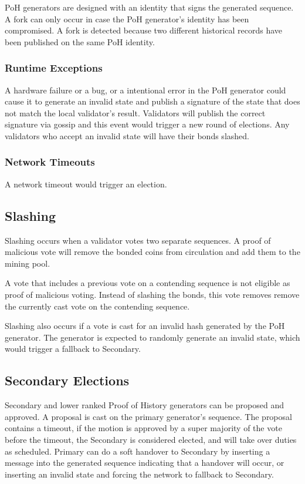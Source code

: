 \documentclass[12pt]{ltjsarticle}
\begin{document}
PoH generators are designed with an identity that signs the generated sequence. A fork can only occur in case the PoH generator’s identity has been compromised. A fork is detected because two different historical records have been published on the same PoH identity.

\subsubsection{Runtime Exceptions}
A hardware failure or a bug, or a intentional error in the PoH generator could cause it to generate an invalid state and publish a signature of the state that does not match the local validator’s result. Validators will publish the correct signature via gossip and this event would trigger a new round of elections. Any validators who accept an invalid state will have their bonds slashed.

\subsubsection{Network Timeouts}

A network timeout would trigger an election.

\subsection{Slashing}
Slashing occurs when a validator votes two separate sequences. A proof of malicious vote will remove the bonded coins from circulation and add them to the mining pool.

A vote that includes a previous vote on a contending sequence is not eligible as proof of malicious voting. Instead of slashing the bonds, this vote removes remove the currently cast vote on the contending sequence.

Slashing also occurs if a vote is cast for an invalid hash generated by the PoH generator. The generator is expected to randomly generate an invalid state, which would trigger a fallback to Secondary.
\subsection{Secondary Elections}
Secondary and lower ranked Proof of History generators can be proposed and approved. A proposal is cast on the primary generator’s sequence. The proposal contains a timeout, if the motion is approved by a super majority of the vote before the timeout, the Secondary is considered elected, and will take over duties as scheduled. Primary can do a soft handover to Secondary by inserting a message into the generated sequence indicating that a handover will occur, or inserting an invalid state and forcing the network to fallback to Secondary.
\end{document}

